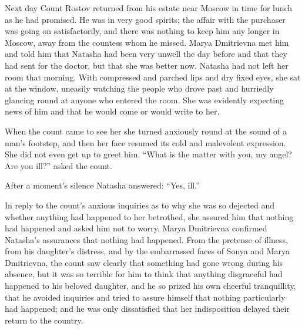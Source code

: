 Next day Count Rostov returned from his estate near Moscow in
time for lunch as he had promised. He was in very good spirits;
the affair with the purchaser was going on satisfactorily, and
there was nothing to keep him any longer in Moscow, away from the
countess whom he missed. Marya Dmitrievna met him and told him
that Natasha had been very unwell the day before and that they
had sent for the doctor, but that she was better now. Natasha had
not left her room that morning. With compressed and parched lips
and dry fixed eyes, she sat at the window, uneasily watching the
people who drove past and hurriedly glancing round at anyone who
entered the room. She was evidently expecting news of him and
that he would come or would write to her.

When the count came to see her she turned anxiously round at the
sound of a man's footstep, and then her face resumed its cold and
malevolent expression. She did not even get up to greet
him. ``What is the matter with you, my angel? Are you ill?''
asked the count.

After a moment's silence Natasha answered: ``Yes, ill.''

In reply to the count's anxious inquiries as to why she was so
dejected and whether anything had happened to her betrothed, she
assured him that nothing had happened and asked him not to
worry. Marya Dmitrievna confirmed Natasha's assurances that
nothing had happened. From the pretense of illness, from his
daughter's distress, and by the embarrassed faces of Sonya and
Marya Dmitrievna, the count saw clearly that something had gone
wrong during his absence, but it was so terrible for him to think
that anything disgraceful had happened to his beloved daughter,
and he so prized his own cheerful tranquillity, that he avoided
inquiries and tried to assure himself that nothing particularly
had happened; and he was only dissatisfied that her indisposition
delayed their return to the country.


